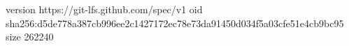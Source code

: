version https://git-lfs.github.com/spec/v1
oid sha256:d5de778a387cb996ee2c1427172ec78e73da91450d034f5a03cfe51e4cb9bc95
size 262240

